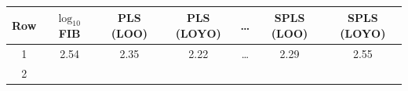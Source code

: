 \begin{longtable}[c]{@{}ccccccc@{}}
\toprule
\begin{minipage}[b]{0.09\columnwidth}\centering\strut
Row
\strut\end{minipage} &
\begin{minipage}[b]{0.17\columnwidth}\centering\strut
\(\log_{10}\) FIB
\strut\end{minipage} &
\begin{minipage}[b]{0.09\columnwidth}\centering\strut
PLS (LOO)
\strut\end{minipage} &
\begin{minipage}[b]{0.10\columnwidth}\centering\strut
PLS (LOYO)
\strut\end{minipage} &
\begin{minipage}[b]{0.09\columnwidth}\centering\strut
\dots
\strut\end{minipage} &
\begin{minipage}[b]{0.09\columnwidth}\centering\strut
SPLS (LOO)
\strut\end{minipage} &
\begin{minipage}[b]{0.10\columnwidth}\centering\strut
SPLS (LOYO)
\strut\end{minipage}\tabularnewline
\midrule
\endhead
\begin{minipage}[t]{0.09\columnwidth}\centering\strut
1
\strut\end{minipage} &
\begin{minipage}[t]{0.17\columnwidth}\centering\strut
2.54
\strut\end{minipage} &
\begin{minipage}[t]{0.09\columnwidth}\centering\strut
2.35
\strut\end{minipage} &
\begin{minipage}[t]{0.10\columnwidth}\centering\strut
2.22
\strut\end{minipage} &
\begin{minipage}[t]{0.09\columnwidth}\centering\strut
\dots
\strut\end{minipage} &
\begin{minipage}[t]{0.09\columnwidth}\centering\strut
2.29
\strut\end{minipage} &
\begin{minipage}[t]{0.10\columnwidth}\centering\strut
2.55
\strut\end{minipage}\tabularnewline
\begin{minipage}[t]{0.09\columnwidth}\centering\strut
2
\strut\end{minipage} &
\begin{minipage}[t]{0.17\columnwidth}\centering\strut

\end{minipage}
\end{longtable}
